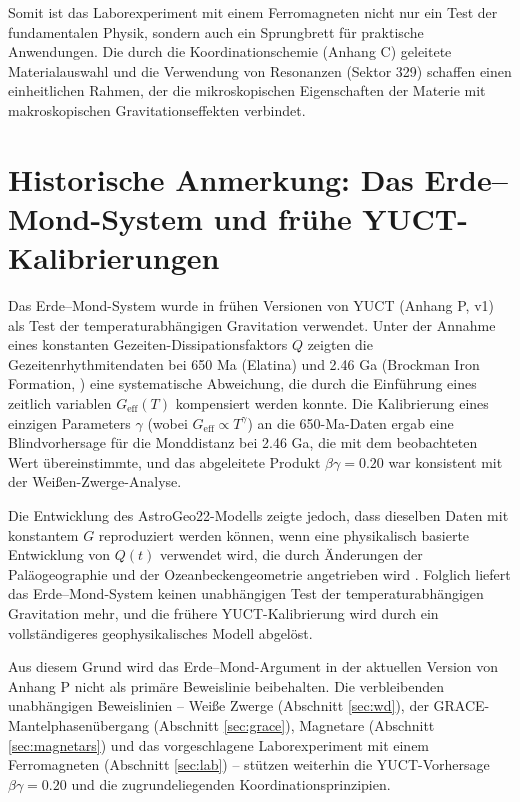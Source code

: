 \documentclass[12pt]{article}
\theoremstyle{remark}
\begin{document}
	Somit ist das Laborexperiment mit einem Ferromagneten nicht nur ein Test der fundamentalen Physik, sondern auch ein Sprungbrett für praktische Anwendungen. Die durch die Koordinationschemie (Anhang C) geleitete Materialauswahl und die Verwendung von Resonanzen (Sektor 329) schaffen einen einheitlichen Rahmen, der die mikroskopischen Eigenschaften der Materie mit makroskopischen Gravitationseffekten verbindet.
	
	\section{Historische Anmerkung: Das Erde–Mond-System und frühe YUCT-Kalibrierungen}
	\label{sec:earth-moon}
	
	Das Erde–Mond-System wurde in frühen Versionen von YUCT (Anhang P, v1) als Test der temperaturabhängigen Gravitation verwendet. Unter der Annahme eines konstanten Gezeiten-Dissipationsfaktors \(Q\) zeigten die Gezeitenrhythmitendaten bei 650 Ma (Elatina) und 2.46 Ga (Brockman Iron Formation, \cite{Lantink2022}) eine systematische Abweichung, die durch die Einführung eines zeitlich variablen \(G_{\mathrm{eff}}(T)\) kompensiert werden konnte. Die Kalibrierung eines einzigen Parameters \(\gamma\) (wobei \(G_{\mathrm{eff}}\propto T^{\gamma}\)) an die 650-Ma-Daten ergab eine Blindvorhersage für die Monddistanz bei 2.46 Ga, die mit dem beobachteten Wert übereinstimmte, und das abgeleitete Produkt \(\beta\gamma = 0.20\) war konsistent mit der Weißen-Zwerge-Analyse.
	
	Die Entwicklung des AstroGeo22-Modells \cite{Farhat2022} zeigte jedoch, dass dieselben Daten mit konstantem \(G\) reproduziert werden können, wenn eine physikalisch basierte Entwicklung von \(Q(t)\) verwendet wird, die durch Änderungen der Paläogeographie und der Ozeanbeckengeometrie angetrieben wird \cite{Zeeden2023}. Folglich liefert das Erde–Mond-System keinen unabhängigen Test der temperaturabhängigen Gravitation mehr, und die frühere YUCT-Kalibrierung wird durch ein vollständigeres geophysikalisches Modell abgelöst.
	
	Aus diesem Grund wird das Erde–Mond-Argument in der aktuellen Version von Anhang P nicht als primäre Beweislinie beibehalten. Die verbleibenden unabhängigen Beweislinien – Weiße Zwerge (Abschnitt \ref{sec:wd}), der GRACE-Mantelphasenübergang (Abschnitt \ref{sec:grace}), Magnetare (Abschnitt \ref{sec:magnetars}) und das vorgeschlagene Laborexperiment mit einem Ferromagneten (Abschnitt \ref{sec:lab}) – stützen weiterhin die YUCT-Vorhersage \(\beta\gamma = 0.20\) und die zugrundeliegenden Koordinationsprinzipien.
	
\end{document}
